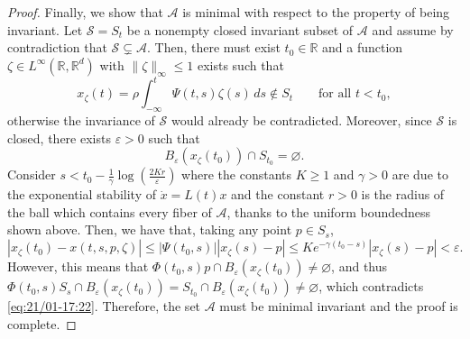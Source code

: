 \documentclass[10pt,a4paper]{amsart}
\newcommand{\A}{\mathcal{A}}
\newcommand{\R}{\mathbb{R}}
\newcommand{\ep}{\varepsilon}
\begin{document}
\begin{proof}
 Finally, we show that     $\A$ is minimal with respect to the property of being invariant. Let $\mathcal{S}={S_t}$ be a nonempty closed invariant subset of $\A$ and assume by contradiction that $\mathcal{S}\subsetneq \A$. Then, there must exist $t_0\in\R$ and a function $\zeta\in L^\infty (\R,\R^d)$ with $\|\zeta\|_\infty\le 1$ exists such that 
\[
x_\zeta(t)=\rho\int_{-\infty}^{t}\Psi(t,s)\zeta(s)\,ds\notin S_t\qquad \text{for all } t<t_0,
\]
otherwise the invariance of $\mathcal{S}$ would already be contradicted. Moreover, since $\mathcal{S}$ is closed, there exists $\ep>0$ such that 
\begin{equation}\label{eq:21/01-17:22}
B_\ep(x_\zeta(t_0))\cap S_{t_0}=\varnothing.
\end{equation}
Consider $s<t_0-\frac{1}{\gamma}\log(\frac{2Kr}{\ep})$ where the constants $K\ge1$ and $\gamma>0$ are due to the exponential stability of $\dot x=L(t)x$ and the constant $r>0$ is the radius of the ball which contains every fiber of $\A$, thanks to the uniform boundedness shown above. Then, we have that, taking any point $p\in S_s$,
\[
|x_\zeta(t_0)-x(t,s,p,\zeta)|\le|\Psi(t_0,s)||x_\zeta(s)-p|\le K e^{-\gamma(t_0-s)}|x_\zeta(s)-p|<\ep.
\]
However, this means that $\Phi(t_0,s)p\cap B_\ep(x_\zeta(t_0))\ne \varnothing$, and thus $\Phi(t_0,s)S_s\cap B_\ep(x_\zeta(t_0))=S_{t_0}\cap B_\ep(x_\zeta(t_0))\ne\varnothing$, which contradicts \eqref{eq:21/01-17:22}. Therefore, the set $\A$ must be minimal invariant and the proof is complete.
\end{proof}
\end{document}
